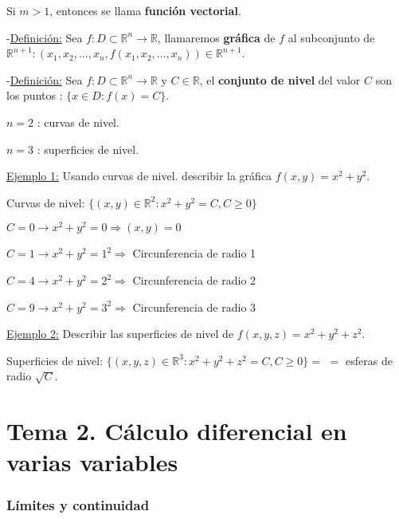 \documentclass[12pt, titlepage]{article}
\newcommand{\R}{\mathbb{R}}
\newcommand{\definicion}{\noindent-\underline{Definición:} }
\begin{document}
Si $m > 1$, entonces se llama \textbf{función vectorial}.
\vspace{5mm}

\definicion Sea $f : D \subset \R^n \to \R$, llamaremos \textbf{gráfica} de $f$ al subconjunto de $\R^
{n+1} : (x_1, x_2,..., x_n, f (x_1, x_2,..., x_n)) \in \R^{n+1}$.
\vspace{5mm}

\definicion Sea $f : D \subset \R^n \to \R \text{ y  } C \in \R$, el \textbf{conjunto de nivel} del valor $C$ son 
los puntos : $\{x \in D : f (x) = C\}$.

$n = 2$ : curvas de nivel.

$n = 3$ : superficies de nivel.
\vspace{3mm}

\underline{Ejemplo 1:} Usando curvas de nivel. describir la gráfica $f (x, y) = x^2 + y^2$.
\vspace{3mm}

\indent Curvas de nivel: $\{ (x, y) \in \R^2 : x^2 + y^2 = C, C \geq 0\}$

\indent$C = 0 \to x^2 + y^2 = 0 \Rightarrow (x, y) = 0$

\indent$C = 1 \to x^2 + y^2 = 1^2 \Rightarrow$ Circunferencia de radio 1

\indent$C = 4 \to x^2 + y^2 = 2^2 \Rightarrow$ Circunferencia de radio 2

\indent$C = 9 \to x^2 + y^2 = 3^2 \Rightarrow$ Circunferencia de radio 3
\vspace{3mm}

\underline{Ejemplo 2:} Describir las superficies de nivel de $f (x, y, z) = x^2 + y^2 + z^2$.
\vspace{3mm}

\indent \indent Superficies de nivel: $\{ (x, y, z) \in \R^3 : x^2 + y^2 + z^2 = C, C \geq 0\} =$  \indent \indent $=$ esferas de radio $\sqrt{C}$.
\vspace{5mm}


\part*{Tema 2. Cálculo diferencial en varias variables}
\vspace{5mm}

\setcounter{section}{0}


\section{Límites y continuidad}
\vspace{5mm}
\end{document}
